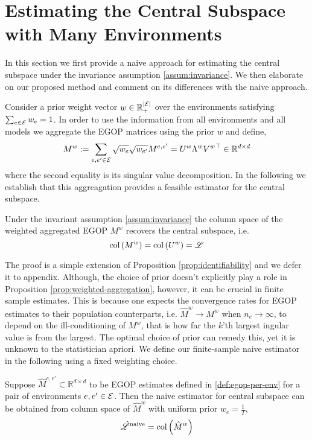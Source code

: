 
\section{Estimating the Central Subspace with Many Environments}
In this section we first provide a naive approach for estimating the central subspace under the invariance assumption \ref{assum:invariance}.
We then elaborate on our proposed method and comment on its differences with the naive approach.

Consider a prior weight vector $w \in \mathbb{R}_{+}^{\left| \mathcal{E} \right|}$ over the environments satisfying $\sum_{e \in \mathcal{E}} w_e = 1$.
In order to use the information from all environments and all models we aggregate the EGOP matrices using the prior $w$ and define,
$$ M^{w} := \sum_{e,e' \in \mathcal{E}} \sqrt{w_e} \sqrt{w_{e'}} M^{e,e'} = U^{w} \Lambda^w {V^{w}}^{\top} \in \mathbb{R}^{d \times d}  $$
where the second equality is its singular value decomposition. In the following we establish that this aggreagation provides a feasible estimator for the central subspace.
\begin{proposition}
    \label{prop:weighted-aggregation}
    Under the invariant assumption \ref{assum:invariance} the column space of the weighted aggregated EGOP $M^{w}$ recovers the central subspace, i.e.
    $$ \operatorname{col}\left( M^{w} \right) = \operatorname{col}\left( U^{w} \right) = \mathscr{L} $$
\end{proposition}
The proof is a simple extension of Proposition \ref{prop:identifiability} and we defer it to appendix. 
Although, the choice of prior doesn't explicitly play a role in Proposition \ref{prop:weighted-aggregation}, however, it can be crucial in finite sample estimates.
This is because one expects the convergence rates for EGOP estimates to their population counterparts, i.e. $\hat{M}^{w} \to M^{w}$ when $n_e \to \infty$, to depend on the ill-conditioning of $M^{w}$,
that is how far the $k$'th largest ingular value is from the largest. The optimal choice of prior can remedy this, yet it is unknown to the statistician apriori.
We define our finite-sample naive estimator in the following using a fixed weighting choice. 
\begin{definition}
    Suppose $\hat{M}^{e,e'} \subset \mathbb{R}^{d \times d}$ to be EGOP estimates defined in \ref{def:egop-per-env} for a pair of environments $e,e' \in \mathcal{E}$. 
    Then the naive estimator for central subspace can be obtained from column space of $\hat{M}^w$ with uniform prior $w_e = \frac{1}{T}$,
    $$ \hat{\mathscr{L}}^{\operatorname{naive}} = \operatorname{col}\left( \hat{M}^w \right)$$
\end{definition}

